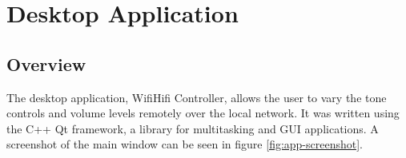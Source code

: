 \documentclass[main.tex]{subfiles}
\begin{document}
\begin{figure}[H]
\end{figure}

\section{Desktop Application}
\subsection{Overview}
The desktop application, WifiHifi Controller, allows the user to vary the tone controls and volume levels remotely over the local network.
It was written using the C++ Qt framework, a library for multitasking and GUI applications.
A screenshot of the main window can be seen in figure \ref{fig:app-screenshot}.
\end{document}
